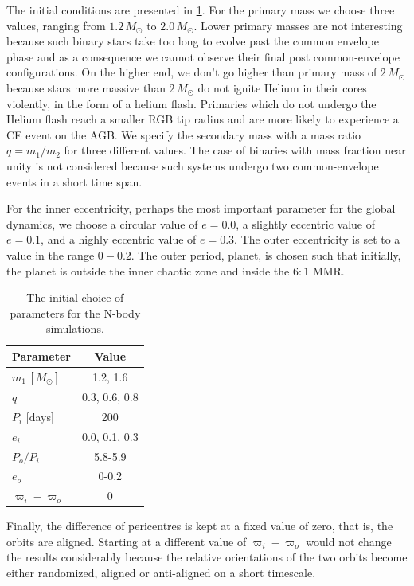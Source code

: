 \documentclass[twoside,openright,titlepage,numbers=noenddot,headinclude,%
                footinclude=true,cleardoublepage=empty,abstractoff, 
                BCOR=5mm,paper=a4,fontsize=11pt,%
                american,%
                ]{scrreprt}%
\begin{document}
The initial conditions are presented in \cref{table:initial_conditions}. 
For the 
primary mass we choose three values, ranging from $1.2\,M_\odot$ to 
$2.0\,M_\odot$.
Lower primary masses are not interesting because such binary stars 
take too long
to evolve past the common envelope phase and as a consequence 
we cannot observe
their final post common-envelope configurations. On the higher 
end, we don't go higher than primary mass of $2\,M_\odot$ because stars more massive
than $2\,M_\odot$ do not ignite Helium in their cores violently, in the
form of a helium flash. Primaries which do not undergo the Helium flash
reach a smaller RGB tip radius and are more likely to experience a CE
event on the AGB.
We specify the secondary mass with a mass ratio $q=m_1/m_2$ for three different 
values. The case of binaries with mass fraction near unity is not considered
because such systems undergo two common-envelope events in a short time span.

For the inner eccentricity, perhaps the most important parameter for the global 
dynamics, 
we choose a circular value of $e=0.0$, a slightly eccentric value of $e=0.1$,
and a highly eccentric value of $e=0.3$. The outer eccentricity is set to
a value in the range $0-0.2$. The outer period, 
planet, is chosen such that initially, the planet is outside the 
inner chaotic zone and inside the $6:1$ MMR.
\begin{table}[h!]
\centering
\begin{tabular}{lc}
\toprule
    Parameter &  Value\\
\midrule
    $m_1\,[M_\odot]$ &1.2, 1.6\\
    $q$&0.3, 0.6, 0.8\\
    $P_i$ [days]& 200\\
    $e_i$ &0.0, 0.1, 0.3\\
    $P_o/P_i$ & 5.8-5.9 \\
    $e_o$& 0-0.2\\
    $\varpi_i-\varpi_o$  & 0\\
         \bottomrule
\end{tabular}
    \caption[Initial conditions for N-body simulations.]{The initial 
    choice of parameters for the N-body simulations.}
\label{table:initial_conditions}
\end{table}
Finally, the difference of pericentres
is kept at a fixed value of zero, that is, the orbits are aligned. Starting
at a different value of $\varpi_i-\varpi_o$ would not change the results 
considerably
because the relative orientations of the two orbits become either randomized,
aligned or anti-aligned on a short timescale.  
\end{document}

